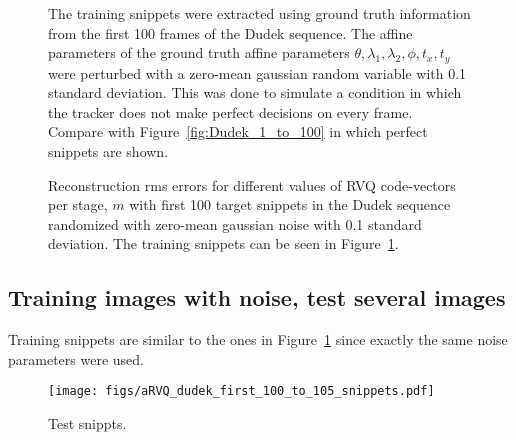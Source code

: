 								\begin{figure}[h]
								\centering
								\caption{The training snippets were extracted using ground truth information from the first 100 frames of the Dudek sequence.  The affine parameters of the ground truth affine parameters $\theta, \lambda_1, \lambda_2, \phi, t_x, t_y$ were perturbed with a zero-mean gaussian random variable with 0.1 standard deviation.  This was done to simulate a condition in which the tracker does not make perfect decisions on every frame.  Compare with Figure~\ref{fig:Dudek_1_to_100} in which perfect snippets are shown.}
								\label{fig:aRVQ_dudek_first_100rand_snippets}
								\end{figure}

								\begin{figure}
								\centering
								\subtable{\begin{tiny}\end{tiny}}
								\caption{Reconstruction rms errors for different values of RVQ code-vectors per stage, $m$ with first 100 target snippets in the Dudek sequence randomized with zero-mean gaussian noise with 0.1 standard deviation.  The training snippets can be seen in Figure~\ref{fig:aRVQ_dudek_first_100rand_snippets}.}
								\label{fig:aRVQ_Dudek_first_100_rand}
								\end{figure}



\clearpage
\newpage
\subsection{Training images with noise, test several images}
Training snippets are similar to the ones in Figure~\ref{fig:aRVQ_dudek_first_100rand_snippets} since exactly the same noise parameters were used.


								\begin{figure}[h!]
								\centering
								\texttt{[image: figs/aRVQ\_dudek\_first\_100\_to\_105\_snippets.pdf]}
								\caption{Test snippts.}
								\label{fig:aRVQ_Dudek_first_100_rand}
								\end{figure}


